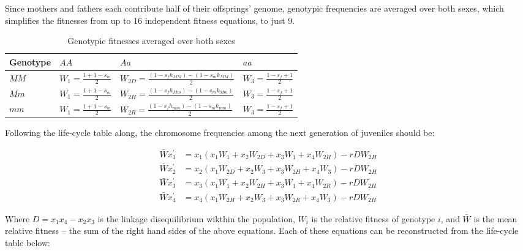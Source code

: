 \documentclass[11pt]{article}
\begin{document}
Since mothers and fathers each contribute half of their offsprings' genome, genotypic frequencies are averaged over both sexes, which simplifies the fitnesses from up to 16 independent fitness equations, to just 9.
\renewcommand{\arraystretch}{1.5}
\begin{table}[h]
\caption{Genotypic fitnesses averaged over both sexes}
\label{Table:2-locus fitnesses}
\centering
\begin{tabular}{l  p{3cm} p{6cm} p{3cm}} \hline
Genotype & $AA$ & $Aa$ & $aa$ \\
\hline
$MM$ & $W_1 = \frac{1 + 1-s_m}{2}$ & $W_{2 D} = \frac{(1-s_f h_{MM}) - (1-s_m k_{MM})}{2}$ & $W_3 = \frac{1-s_f + 1}{2}$ \\
$Mm$ & $W_1 = \frac{1 + 1-s_m}{2}$ & $W_{2 H} = \frac{(1-s_f h_{Mm}) - (1-s_m k_{Mm})}{2}$ & $W_3 = \frac{1-s_f + 1}{2}$ \\
$mm$ & $W_1 = \frac{1 + 1-s_m}{2}$ & $W_{2 R} = \frac{(1-s_f h_{mm}) - (1-s_m k_{mm})}{2}$ & $W_3 = \frac{1-s_f + 1}{2}$ \\
\hline
\end{tabular}
\bigskip{}
{\footnotesize }
\end{table}



Following the life-cycle table along, the chromosome frequencies among the next generation of juveniles should be:

\begin{align}
\bar{W}x^{'}_{1} &= x_1(x_1 W_1    + x_2 W_{2D} + x_3 W_1    + x_4 W_{2H}) - r D W_{2H} \\
\bar{W}x^{'}_{2} &= x_2(x_1 W_{2D} + x_2 W_{3}  + x_3 W_{2H} + x_4 W_{3})   - r D W_{2H} \\
\bar{W}x^{'}_{3} &= x_3(x_1 W_1    + x_2 W_{2H} + x_3 W_1    + x_4 W_{2R}) - r D W_{2H} \\
\bar{W}x^{'}_{4} &= x_4(x_1 W_{2H} + x_2 W_{3}  + x_3 W_{2R} + x_4 W_{3})  - r D W_{2H}   \end{align}

Where $D = x_{1} x_{4} - x_{2} x_{3}$ is the linkage disequilibrium wikthin the population, $W_{i}$ is the relative fitness of genotype $i$, and $\bar{W}$ is the mean relative fitness -- the sum of the right hand sides of the above equations. Each of these equations can be reconstructed from the life-cycle table below:
\end{document}
